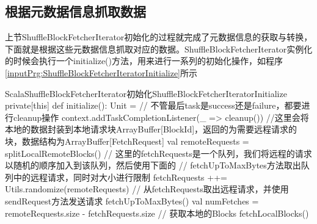 \subsection{根据元数据信息抓取数据}
上节ShuffleBlockFetcherIterator初始化的过程就完成了元数据信息的获取与转换，下面就是根据这些元数据信息抓取对应的数据。ShuffleBlockFetcherIterator实例化的时候会执行一个initialize()方法，用来进行一系列的初始化操作，如程序\ref{inputPrg:ShuffleBlockFetcherIteratorInitialize}所示
\begin{codeInput}{Scala}{ShuffleBlockFetcherIterator初始化}{ShuffleBlockFetcherIteratorInitialize}
private[this] def initialize(): Unit = {
  // 不管最后task是success还是failure，都要进行cleanup操作
  context.addTaskCompletionListener(_ => cleanup())	
  //这里会将本地的数据封装到本地请求块ArrayBuffer[BlockId]，返回的为需要远程请求的块，数据结构为ArrayBuffer[FetchRequest]
  val remoteRequests = splitLocalRemoteBlocks()
  // 这里的fetchRequests是一个队列，我们将远程的请求以随机的顺序加入到该队列，然后使用下面的
  // fetchUpToMaxBytes方法取出队列中的远程请求，同时对大小进行限制
  fetchRequests ++= Utils.randomize(remoteRequests)	
  // 从fetchRequests取出远程请求，并使用sendRequest方法发送请求
  fetchUpToMaxBytes()	
  val numFetches = remoteRequests.size - fetchRequests.size
  // 获取本地的Blocks
  fetchLocalBlocks()
}
\end{codeInput}

